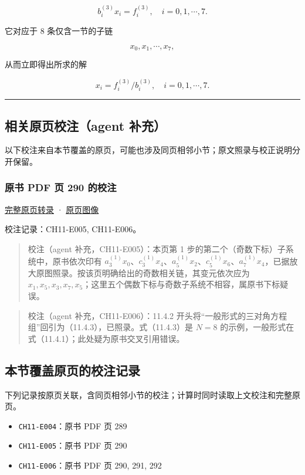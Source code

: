 \documentclass[
  10pt,
  fontset=fandol]{ctexart}
\providecommand{\tightlist}{%
  \setlength{\itemsep}{0pt}\setlength{\parskip}{0pt}}
\begin{document}
\[
b_i^{(3)}x_i=f_i^{(3)},\quad i=0,1,\cdots,7.
\]

它对应于 8 条仅含一节的子链

\[
x_0,x_1,\cdots,x_7,
\]

从而立即得出所求的解

\[
x_i=f_i^{(3)}/b_i^{(3)},\quad i=0,1,\cdots,7.
\]

\begin{center}\rule{0.5\linewidth}{0.5pt}\end{center}

\subsection{相关原页校注（agent 补充）}\label{ux76f8ux5173ux539fux9875ux6821ux6ce8agent-ux8865ux5145}

以下校注来自本节覆盖的原页，可能也涉及同页相邻小节；原文照录与校正说明分开保留。

\subsubsection{原书 PDF 页 290 的校注}\label{ux539fux4e66-pdf-ux9875-290-ux7684ux6821ux6ce8}

\href{../pages/pdf-290.md}{完整原页转录} · \href{../../source-images/pdf-290.jpeg}{原页图像}

校注记录：CH11-E005, CH11-E006。

\begin{quote}
校注（agent 补充，CH11-E005）：本页第 1 步的第二个（奇数下标）子系统中，原书依次印有 \(a_3^{(1)}x_0\)、\(c_3^{(1)}x_4\)、\(a_5^{(1)}x_2\)、\(c_5^{(1)}x_6\)、\(a_7^{(1)}x_4\)，已据放大原图照录。按该页明确给出的奇数相关链，其变元依次应为 \(x_1,x_5,x_3,x_7,x_5\)；这里五个偶数下标与奇数子系统不相容，属原书下标疑误。
\end{quote}

\begin{quote}
校注（agent 补充，CH11-E006）：11.4.2 开头将``一般形式的三对角方程组''回引为（11.4.3），已照录。式（11.4.3）是 \(N=8\) 的示例，一般形式在式（11.4.1）；此处疑为原书交叉引用错误。
\end{quote}

\subsection{本节覆盖原页的校注记录}\label{ux672cux8282ux8986ux76d6ux539fux9875ux7684ux6821ux6ce8ux8bb0ux5f55}

下列记录按原页关联，含同页相邻小节的校注；计算时同时读取上文校注和完整原页。

\begin{itemize}
\tightlist
\item
  \texttt{CH11-E004}：原书 PDF 页 289
\item
  \texttt{CH11-E005}：原书 PDF 页 290
\item
  \texttt{CH11-E006}：原书 PDF 页 290, 291, 292
\end{itemize}
\end{document}
